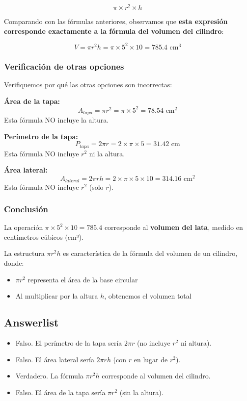 \documentclass[
]{article}
\providecommand{\tightlist}{%
  \setlength{\itemsep}{0pt}\setlength{\parskip}{0pt}}
\begin{document}
\[\pi \times r^2 \times h\]

Comparando con las fórmulas anteriores, observamos que \textbf{esta
expresión corresponde exactamente a la fórmula del volumen del
cilindro}:

\[V = \pi r^2 h = \pi \times 5^2 \times 10 = 785.4 \text{ cm}^3\]

\subsubsection{Verificación de otras
opciones}\label{verificaciuxf3n-de-otras-opciones}

Verifiquemos por qué las otras opciones son incorrectas:

\textbf{Área de la tapa:}
\[A_{tapa} = \pi r^2 = \pi \times  5 ^2 =  78.54  \text{ cm}^2\] Esta
fórmula NO incluye la altura.

\textbf{Perímetro de la tapa:}
\[P_{tapa} = 2\pi r = 2 \times \pi \times  5  =  31.42  \text{ cm}\]
Esta fórmula NO incluye \(r^2\) ni la altura.

\textbf{Área lateral:}
\[A_{lateral} = 2\pi r h = 2 \times \pi \times  5  \times  10  =  314.16  \text{ cm}^2\]
Esta fórmula NO incluye \(r^2\) (solo \(r\)).

\subsubsection{Conclusión}\label{conclusiuxf3n}

La operación \(\pi \times 5^2 \times 10 = 785.4\) corresponde al
\textbf{volumen del lata}, medido en centímetros cúbicos (cm³).

La estructura \(\pi r^2 h\) es característica de la fórmula del volumen
de un cilindro, donde:

\begin{itemize}
\tightlist
\item
  \(\pi r^2\) representa el área de la base circular
\item
  Al multiplicar por la altura \(h\), obtenemos el volumen total
\end{itemize}

\subsection{Answerlist}\label{answerlist-1}

\begin{itemize}
\tightlist
\item
  Falso. El perímetro de la tapa sería \(2\pi r\) (no incluye \(r^2\) ni
  altura).
\item
  Falso. El área lateral sería \(2\pi r h\) (con \(r\) en lugar de
  \(r^2\)).
\item
  Verdadero. La fórmula \(\pi r^2 h\) corresponde al volumen del
  cilindro.
\item
  Falso. El área de la tapa sería \(\pi r^2\) (sin la altura).
\end{itemize}
\end{document}
